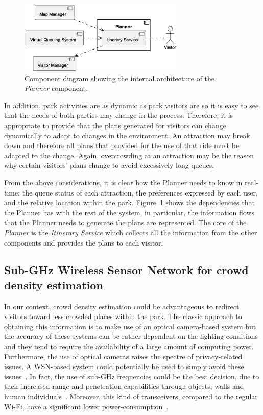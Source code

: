 \begin{figure}[H]
	\centering
	\includegraphics[width=0.7\textwidth]{img/planner.eps}
	\caption{Component diagram showing the internal architecture of the \textit{Planner} component.}
	\label{fig:planner-arch}
\end{figure}

In addition, park activities are as dynamic as park visitors are so it is easy to see that the needs of both parties may change in the process.
Therefore, it is appropriate to provide that the plans generated for visitors can change dynamically to adapt to changes in the environment.
An attraction may break down and therefore all plans that provided for the use of that ride must be adapted to the change.
Again, overcrowding at an attraction may be the reason why certain visitors' plans change to avoid excessively long queues.

From the above considerations, it is clear how the Planner needs to know in real-time: the queue status of each attraction, the preferences expressed
by each user, and the relative location within the park. Figure~\ref{fig:planner-arch} shows the dependencies that the Planner has with the rest of
the system, in particular, the information flows that the Planner needs to generate the plans are represented.
The core of the \textit{Planner} is the \textit{Itinerary Service} which collects all the information from the other components and provides the plans to each visitor.

\subsection{Sub-GHz Wireless Sensor Network for crowd density estimation}\label{subsec:sub-ghz-wireless-sensor-network-for-crowd-density-estimation}
In our context, crowd density estimation could be advantageous to redirect visitors toward less crowded places within the park.
The classic approach to obtaining this information is to make use of an optical camera-based system but the accuracy of these systems can be
rather dependent on the lighting conditions and they tend to require the availability of a large amount of computing power.
Furthermore, the use of optical cameras raises the spectre of privacy-related issues.
A WSN-based system could potentially be used to simply avoid these issues~\cite{denis2018large}.
In fact, the use of sub-GHz frequencies could be the best decision, due to their increased range and penetration capabilities through objects, walls and human individuals~\cite{denis2018large}.
Moreover, this kind of transceivers, compared to the regular Wi-Fi, have a significant lower power-consumption~\cite{fudickar2014comparing}.

